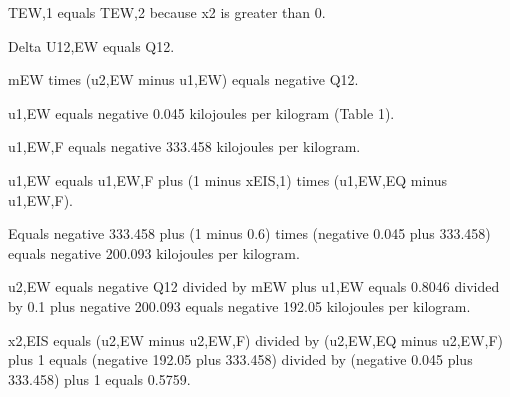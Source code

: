 TEW,1 equals TEW,2 because x2 is greater than 0.  

Delta U12,EW equals Q12.  

mEW times (u2,EW minus u1,EW) equals negative Q12.  

u1,EW equals negative 0.045 kilojoules per kilogram (Table 1).  

u1,EW,F equals negative 333.458 kilojoules per kilogram.  

u1,EW equals u1,EW,F plus (1 minus xEIS,1) times (u1,EW,EQ minus u1,EW,F).  

Equals negative 333.458 plus (1 minus 0.6) times (negative 0.045 plus 333.458) equals negative 200.093 kilojoules per kilogram.  

u2,EW equals negative Q12 divided by mEW plus u1,EW equals 0.8046 divided by 0.1 plus negative 200.093 equals negative 192.05 kilojoules per kilogram.  

x2,EIS equals (u2,EW minus u2,EW,F) divided by (u2,EW,EQ minus u2,EW,F) plus 1 equals (negative 192.05 plus 333.458) divided by (negative 0.045 plus 333.458) plus 1 equals 0.5759.